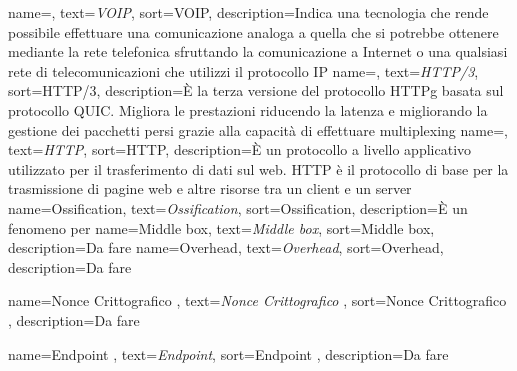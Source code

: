  {
    name=,
    text=\emph{VOIP},
    sort=VOIP,
    description={Indica una tecnologia che rende possibile effettuare una comunicazione analoga a quella che si potrebbe ottenere mediante la rete telefonica sfruttando la 
    comunicazione a Internet o una qualsiasi rete di telecomunicazioni che utilizzi il protocollo IP} 
}
 {
    name=,
    text=\emph{HTTP/3},
    sort=HTTP/3,
    description={È la terza versione del protocollo \gls{HTTPg} basata sul protocollo \gls{QUIC}. Migliora le prestazioni riducendo la latenza e migliorando la gestione dei pacchetti persi grazie alla capacità di effettuare \gls{multiplexing}}
}
 {
    name=,
    text=\emph{HTTP},
    sort=HTTP,
    description={È un protocollo a livello applicativo utilizzato per il trasferimento di dati sul web. HTTP è il protocollo di base per la trasmissione di pagine web e altre risorse tra un \gls{client} e un \gls{server}}
}
 {
    name=Ossification,
    text=\emph{Ossification},
    sort=Ossification,
    description={È un fenomeno per }
}
 {
    name=Middle box,
    text=\emph{Middle box},
    sort=Middle box,
    description={Da fare}
}
 {
    name=Overhead,
    text=\emph{Overhead},
    sort=Overhead,
    description={Da fare}
}

 {
    name=Nonce Crittografico ,
    text=\emph{Nonce Crittografico },
    sort=Nonce Crittografico ,
    description={Da fare}
}

 {
    name=Endpoint ,
    text=\emph{Endpoint},
    sort=Endpoint ,
    description={Da fare}
}

